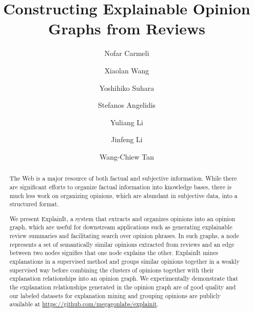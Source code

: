 \documentclass[sigconf]{acmart}
\newcommand{\system}{{\sc ExplainIt}}
\begin{document}
\title{Constructing Explainable Opinion Graphs from Reviews}
\author{Nofar Carmeli}

\author{Xiaolan Wang}

\author{Yoshihiko Suhara}

\author{Stefanos Angelidis}

\author{Yuliang Li}

\author{Jinfeng Li}

\author{Wang-Chiew Tan}

\renewcommand{\shortauthors}{Carmeli, N., Wang, X., Suhara, Y., Angelidis, S., Li, Y., Li, J., and Tan, W.C.}

\begin{abstract}
The Web is a major resource of both factual and subjective information. While there are significant efforts to organize factual information into knowledge bases, there is much less work on organizing opinions, which are abundant in subjective data, into a structured format.

We present \system, a system that extracts and organizes opinions into an opinion graph, which are useful for downstream applications such as generating explainable review summaries and facilitating search over opinion phrases. In such graphs, a node represents a set of semantically similar opinions extracted from reviews and an edge between two nodes signifies that one node explains the other. \system{} mines explanations in a supervised method and groups similar opinions together in a weakly supervised way before combining the clusters of opinions together with their explanation relationships into an opinion graph. We experimentally demonstrate that the explanation relationships generated in the opinion graph are of good quality and our labeled datasets for explanation mining and grouping opinions are publicly available at \url{https://github.com/megagonlabs/explainit}.
\end{abstract}
\end{document}
